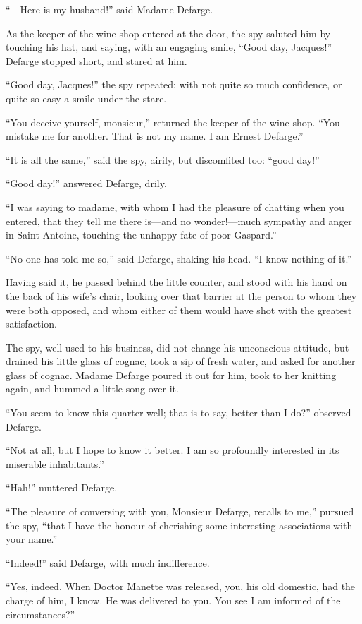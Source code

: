 ``---Here is my husband!'' said Madame Defarge.

As the keeper of the wine-shop entered at the door, the spy saluted
him by touching his hat, and saying, with an engaging smile, ``Good
day, Jacques!''  Defarge stopped short, and stared at him.

``Good day, Jacques!'' the spy repeated; with not quite so much
confidence, or quite so easy a smile under the stare.

``You deceive yourself, monsieur,'' returned the keeper of the
wine-shop.  ``You mistake me for another.  That is not my name.
I am Ernest Defarge.''

``It is all the same,'' said the spy, airily, but discomfited too:
``good day!''

``Good day!'' answered Defarge, drily.

``I was saying to madame, with whom I had the pleasure of chatting when
you entered, that they tell me there is---and no wonder!---much sympathy
and anger in Saint Antoine, touching the unhappy fate of poor Gaspard.''

``No one has told me so,'' said Defarge, shaking his head.  ``I know
nothing of it.''

Having said it, he passed behind the little counter, and stood with
his hand on the back of his wife's chair, looking over that barrier
at the person to whom they were both opposed, and whom either of them
would have shot with the greatest satisfaction.

The spy, well used to his business, did not change his unconscious
attitude, but drained his little glass of cognac, took a sip of fresh
water, and asked for another glass of cognac.  Madame Defarge poured it
out for him, took to her knitting again, and hummed a little song over it.

``You seem to know this quarter well; that is to say, better than I do?''
observed Defarge.

``Not at all, but I hope to know it better.  I am so profoundly interested
in its miserable inhabitants.''

``Hah!'' muttered Defarge.

``The pleasure of conversing with you, Monsieur Defarge, recalls to me,''
pursued the spy, ``that I have the honour of cherishing some interesting
associations with your name.''

``Indeed!'' said Defarge, with much indifference.

``Yes, indeed.  When Doctor Manette was released, you, his old domestic,
had the charge of him, I know.  He was delivered to you.  You see I am
informed of the circumstances?''


